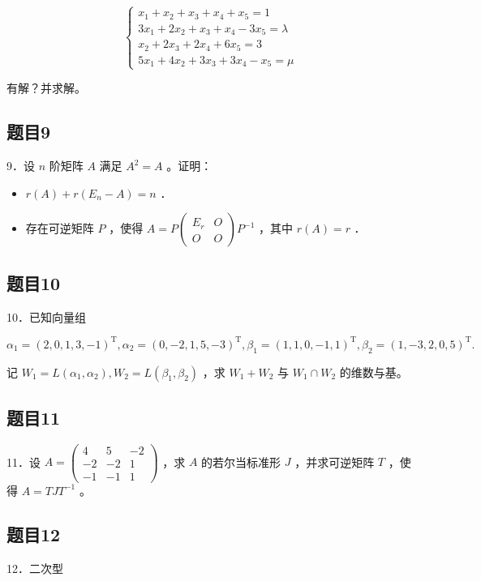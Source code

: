 \documentclass{article}
\begin{document}
\[
\left\{\begin{array}{l}
x_{1}+x_{2}+x_{3}+x_{4}+x_{5}=1 \\
3 x_{1}+2 x_{2}+x_{3}+x_{4}-3 x_{5}=\lambda \\
x_{2}+2 x_{3}+2 x_{4}+6 x_{5}=3 \\
5 x_{1}+4 x_{2}+3 x_{3}+3 x_{4}-x_{5}=\mu
\end{array}\right.
\]

有解？并求解。

\subsection{题目9}
9．设 \(n\) 阶矩阵 \(A\) 满足 \(A^{2}=A\) 。证明：

\begin{itemize}
  \item[（1）] \(r(A)+r\left(E_{n}-A\right)=n\) ．
  \item[（2）] 存在可逆矩阵 \(P\) ，使得 \(A=P\left(\begin{array}{cc}E_{r} & O \\ O & O\end{array}\right) P^{-1}\) ，其中 \(r(A)=r\) ．
\end{itemize}

\subsection{题目10}
10．已知向量组

\[
\alpha_{1}=(2,0,1,3,-1)^{\mathrm{T}}, \alpha_{2}=(0,-2,1,5,-3)^{\mathrm{T}}, \beta_{1}=(1,1,0,-1,1)^{\mathrm{T}}, \beta_{2}=(1,-3,2,0,5)^{\mathrm{T}} .
\]

记 \(W_{1}=L\left(\alpha_{1}, \alpha_{2}\right), W_{2}=L\left(\beta_{1}, \beta_{2}\right)\) ，求 \(W_{1}+W_{2}\) 与 \(W_{1} \cap W_{2}\) 的维数与基。

\subsection{题目11}
11．设 \(A=\left(\begin{array}{ccc}4 & 5 & -2 \\ -2 & -2 & 1 \\ -1 & -1 & 1\end{array}\right)\) ，求 \(A\) 的若尔当标准形 \(J\) ，并求可逆矩阵 \(T\) ，使得 \(A=T J T^{-1}\) 。

\subsection{题目12}
12．二次型
\end{document}
